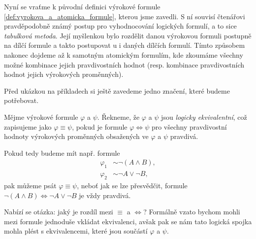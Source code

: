 Nyní se vraťme k původní definici výrokové formule \ref{def:vyrokova_a_atomicka_formule}, kterou jsme zavedli. S ní souvisí čtenářovi pravděpodobně známý postup pro vyhodnocování logických formulí, a to sice \emph{tabulková metoda}. Její myšlenkou bylo rozdělit danou výrokovou formuli postupně na dílčí formule a takto postupovat u i daných dílčích formulí. Tímto způsobem nakonec dojdeme až k samotným atomickým formulím, kde zkoumáme všechny možné kombinace jejich pravdivostních hodnot (resp. kombinace pravdivostních hodnot jejich výrokových proměnných).\par

Před ukázkou na příkladech si ještě zavedeme jedno značení, které budeme potřebovat.
\begin{definition}
    Mějme výrokové formule $\varphi$ a $\psi$. Řekneme, že $\varphi$ a $\psi$ jsou \emph{logicky ekvivalentní}, což zapisujeme jako $\varphi\equiv\psi$, pokud je formule $\varphi \iff \psi$ pro všechny pravdivostní hodnoty výrokových proměnných obsažených ve $\varphi$ a $\psi$ pravdivá.
\end{definition}

Pokud tedy budeme mít např. formule
\begin{align*}
    \varphi_1 &\sim \neg (A \land B),\\
    \varphi_2 &\sim \neg A \lor \neg B,
\end{align*}
pak můžeme psát $\varphi\equiv\psi$, neboť jak se lze přesvědčit, formule $\neg (A \land B) \iff \neg A \lor \neg B$ je vždy pravdivá.\par
Nabízí se otázka: jaký je rozdíl mezi $\equiv$ a $\iff$? Formálně vzato bychom mohli mezi formule jednoduše vkládat ekvivalenci, avšak pak se nám tato logická spojka mohla plést s ekvivalencemi, které jsou součástí $\varphi$ a $\psi$.

